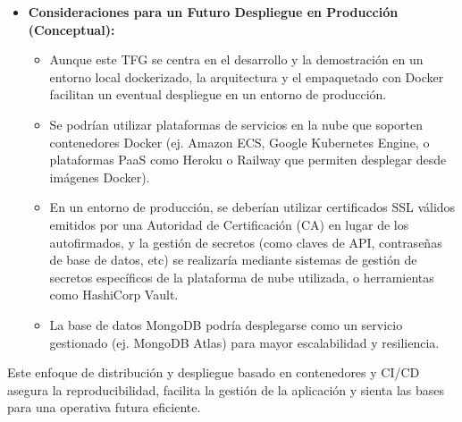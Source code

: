 \begin{itemize}
\begin{itemize}
        \end{itemize}
        \vspace{0.3cm}
        \item \textbf{Consideraciones para un Futuro Despliegue en Producción (Conceptual):}
        \begin{itemize}
            \item Aunque este TFG se centra en el desarrollo y la demostración en un entorno local dockerizado, la arquitectura y el empaquetado con Docker facilitan un eventual despliegue en un entorno de producción.
            \item Se podrían utilizar plataformas de servicios en la nube que soporten contenedores Docker (ej. Amazon ECS, Google Kubernetes Engine, o plataformas PaaS como Heroku o Railway que permiten desplegar desde imágenes Docker).
            \item En un entorno de producción, se deberían utilizar certificados SSL válidos emitidos por una Autoridad de Certificación (CA) en lugar de los autofirmados, y la gestión de secretos (como claves de API, contraseñas de base de datos, etc) se realizaría mediante sistemas de gestión de secretos específicos de la plataforma de nube utilizada, o herramientas como HashiCorp Vault.
            \item La base de datos MongoDB podría desplegarse como un servicio gestionado (ej. MongoDB Atlas) para mayor escalabilidad y resiliencia.
        \end{itemize}
\end{itemize}

Este enfoque de distribución y despliegue basado en contenedores y CI/CD asegura la reproducibilidad, facilita la gestión de la aplicación y sienta las bases para una operativa futura eficiente.